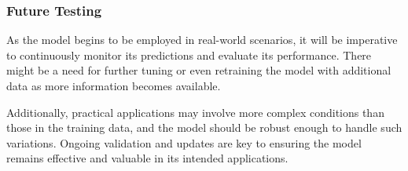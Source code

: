 \subsubsection{Future Testing}
As the model begins to be employed in real-world scenarios, it will be imperative to continuously monitor its predictions and evaluate its performance. There might be a need for further tuning or even retraining the model with additional data as more information becomes available.

Additionally, practical applications may involve more complex conditions than those in the training data, and the model should be robust enough to handle such variations. Ongoing validation and updates are key to ensuring the model remains effective and valuable in its intended applications.

